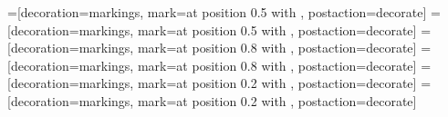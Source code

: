 \newcommand{\restrict}[2]{#1{}_{\mid #2}{}}
\newcommand{\set}[1]{\left\{#1\right\}}
\newcommand{\setc}[2]{\setcl{#1}{#2}}
\newcommand{\setcl}[2]{\left\{ \left. #1 \;\right| \; #2 \right\}}
\newcommand{\setcr}[2]{\left\{ #1 \;\left| \; #2 \right\}\right.}

\newcommand{\floor}[1]{\left\lfloor#1\right\rfloor}
\newcommand{\norm}[1]{\left|\left|#1\right|\right|}
\newcommand{\abs}[1]{\left|#1\right|}

\newcommand{\qi}[2][q]{\left[#2\right]_{#1}}
\newcommand{\qBinomial}[3][q]{\genfrac{[}{]}{0pt}{}{#2}{#3}_{#1}}
\newcommand{\qPoch}[3]{\left(#1;#2\right)_{#3}}

\newcommand{\card}[1]{\sharp{#1}}

\newcommand{\bdy}{\partial}
\newcommand{\compose}{\circ}
\newcommand{\eset}{\emptyset}

\newcommand{\directSum}{\oplus}
\newcommand{\DirectSum}{\bigoplus}
\newcommand{\tensor}{\otimes}
\newcommand{\Tensor}{\bigotimes}

\newcommand{\Homa}[3]{\Hom_{#1}\left(#2,#3\right)}
\newcommand{\Hom}{\operatorname{Hom}}
\newcommand{\End}[1]{\operatorname{End}\left(#1\right)}


\ifpdf
	\usepackage[pdftex,plainpages=false,hypertexnames=false,pdfpagelabels]{hyperref}
	\usepackage[pdftex]{graphicx}
\else
	\usepackage[plainpages=false,hypertexnames=false,pdfpagelabels]{hyperref}
	\usepackage{graphicx}
\fi

\usepackage{tikz}
\usetikzlibrary{shapes}
\usetikzlibrary{backgrounds}
\usetikzlibrary{decorations,decorations.pathreplacing,decorations.markings}
\usetikzlibrary{fit,calc,through}
\usetikzlibrary{external}

=[decoration={markings, mark=at position 0.5 with {\arrow{>}}}, postaction={decorate}]
=[decoration={markings, mark=at position 0.5 with {\arrow{<}}}, postaction={decorate}]
=[decoration={markings, mark=at position 0.8 with {\arrow{>}}}, postaction={decorate}]
=[decoration={markings, mark=at position 0.8 with {\arrow{<}}}, postaction={decorate}]
=[decoration={markings, mark=at position 0.2 with {\arrow{>}}}, postaction={decorate}]
=[decoration={markings, mark=at position 0.2 with {\arrow{<}}}, postaction={decorate}]


\usepackage{environ}
\usepackage{xargs}

